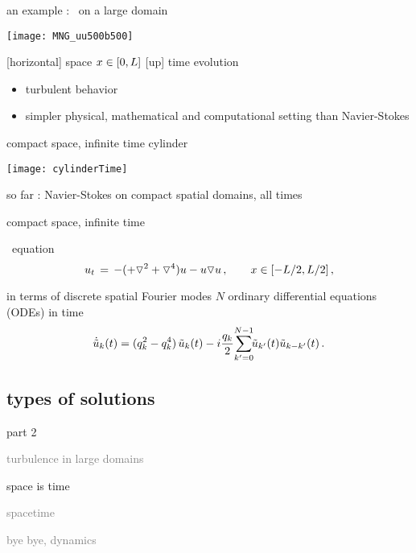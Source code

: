 \begin{frame}{an example : \KS\ on a large domain}
\begin{center}
  \texttt{[image: MNG\_uu500b500]}
\end{center}

{\footnotesize
[horizontal] space $\ssp \in [0,L]$
\qquad
{[up]} time evolution
}

\begin{itemize}
\item turbulent behavior
\item simpler physical, mathematical and computational setting than Navier-Stokes
\end{itemize}
\end{frame}

\begin{frame}{compact space, infinite time cylinder}
\begin{center}
\texttt{[image: cylinderTime]}
\end{center}
so far : Navier-Stokes on compact spatial domains, all times
\end{frame}

\begin{frame}{compact space, infinite time} %
\begin{block}{\KS\ equation}
\[
  u_t \,=\,
    -({\color{red}+}\triangledown^2 +{\color{red}\triangledown^4}) u
    - u \triangledown u
    \,,\qquad   x \in [-L/2,L/2]
    \,,
\]
\end{block}

\bigskip

\begin{block}{in terms of discrete spatial Fourier modes}
$N$ ordinary differential equations (ODEs) in time
\[
\dot{\Fu}_k(\zeit) = ( q_k^2 - q_k^4 )\, \Fu_k(\zeit)
- i \frac{q_k}{2} \!\sum_{k'=0}^{N-1} \!\!\Fu_{k'}(\zeit) \Fu_{k-k'}(\zeit)
\,.
\]
\end{block}
\end{frame}


\subsection{types of solutions}
\begin{frame}{part 2}
\begin{enumerate}
              \item
    \textcolor{gray}{\small
turbulence in large domains
        }
              \item
    {\Large
space is time
    }\textcolor{gray}{\small
              \item
spacetime
              \item
bye bye, dynamics
                    }
            \end{enumerate}
\end{frame}

